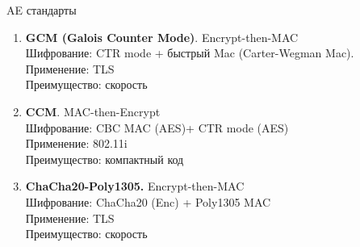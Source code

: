 \documentclass[usenames,dvipsnames,8pt,aspectratio=169]{beamer}
\begin{document}
\begin{frame}{AE стандарты}
\LARGE
\begin{enumerate}
	 pt
	\item \textbf{GCM (Galois Counter Mode)}. {\Large {\color{Orange}Encrypt-then-MAC}  \\
		Шифрование: CTR mode + быстрый Mac (Carter-Wegman Mac).  \\
		Применение: TLS \\
		Преимущество: скорость
	 }
 \pause
 	\item \textbf{CCM}.  {\Large {\color{Orange}MAC-then-Encrypt}  \\
 		Шифрование: CBC MAC (AES)+ CTR mode (AES)  \\
 		Применение: 802.11i \\
 		Преимущество: компактный код
 	}
 \pause
 	\item \textbf{ChaCha20-Poly1305.} {\Large {\color{Orange} Encrypt-then-MAC}  \\
 		Шифрование: ChaCha20 (Enc) + Poly1305 MAC \\
 		Применение: TLS \\
 		Преимущество: скорость
 	}
\end{enumerate}
\end{frame}
\end{document}
